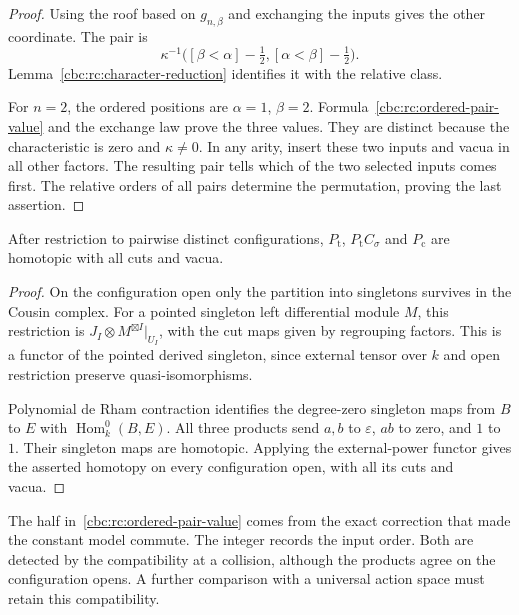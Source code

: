 \begin{proof}
Using the roof based on $g_{n,\beta}$ and exchanging
the inputs gives the other coordinate. The pair is
\begin{equation}\label{cbc:rc:ordered-pair-value}
 \kappa^{-1}
 \bigl([\beta<\alpha]-\tfrac12,
       [\alpha<\beta]-\tfrac12\bigr).
\end{equation}
Lemma~\ref{cbc:rc:character-reduction} identifies it
with the relative class.

For $n=2$, the ordered positions are $\alpha=1$,
$\beta=2$. Formula~\eqref{cbc:rc:ordered-pair-value}
and the exchange law prove the three values.
They are distinct because the characteristic is zero
and $\kappa\ne0$.
In any arity, insert these two inputs and vacua in
all other factors. The resulting pair tells which
of the two selected inputs comes first. The relative
orders of all pairs determine the permutation,
proving the last assertion.
\end{proof}

\begin{proposition}\label{cbc:rc:disjoint-products}
After restriction to pairwise distinct configurations,
$P_{\mathrm t}$, $P_{\mathrm t}C_\sigma$ and $P_{\mathrm c}$
are homotopic with all cuts and vacua.
\end{proposition}
\begin{proof}
On the configuration open only the partition into
singletons survives in the Cousin complex. For a
pointed singleton left differential module $M$, this
restriction is
$J_I\otimes M^{\boxtimes I}|_{U_I}$, with the cut
maps given by regrouping factors. This is a functor
of the pointed derived singleton, since external
tensor over $k$ and open restriction preserve
quasi-isomorphisms.

Polynomial de Rham contraction identifies the
degree-zero singleton maps from $B$ to $E$ with
$\operatorname{Hom}^0_k(B,E)$.
All three products send $a,b$ to $\varepsilon$,
$ab$ to zero, and $1$ to $1$. Their singleton maps
are homotopic. Applying the external-power functor
gives the asserted homotopy on every configuration
open, with all its cuts and vacua.
\end{proof}

The half in~\eqref{cbc:rc:ordered-pair-value} comes
from the exact correction that made the constant
model commute. The integer records the input order.
Both are detected by the compatibility at a collision,
although the products agree on the configuration
opens. A further comparison with a universal action
space must retain this compatibility.

